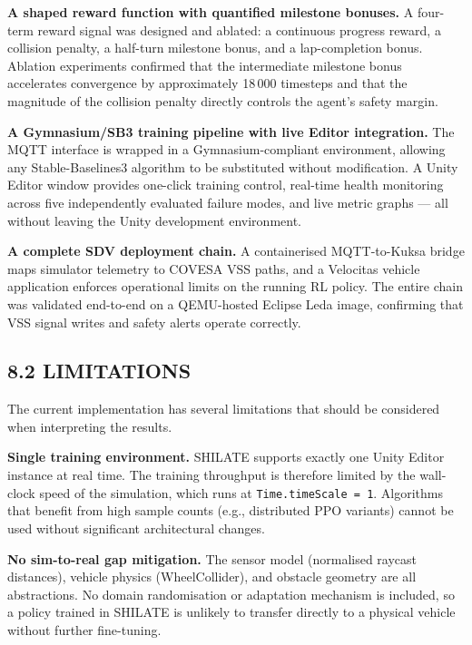 \documentclass[12pt,a4paper]{article}
\begin{document}
\textbf{A shaped reward function with quantified milestone bonuses.} A
four-term reward signal was designed and ablated: a continuous progress reward,
a collision penalty, a half-turn milestone bonus, and a lap-completion bonus.
Ablation experiments confirmed that the intermediate milestone bonus accelerates
convergence by approximately 18\,000 timesteps and that the magnitude of the
collision penalty directly controls the agent's safety margin.

\textbf{A Gymnasium/SB3 training pipeline with live Editor integration.} The
MQTT interface is wrapped in a Gymnasium-compliant environment, allowing any
Stable-Baselines3 algorithm to be substituted without modification. A Unity
Editor window provides one-click training control, real-time health monitoring
across five independently evaluated failure modes, and live metric graphs ---
all without leaving the Unity development environment.

\textbf{A complete SDV deployment chain.} A containerised MQTT-to-Kuksa bridge
maps simulator telemetry to COVESA VSS paths, and a Velocitas vehicle
application enforces operational limits on the running RL policy. The entire
chain was validated end-to-end on a QEMU-hosted Eclipse Leda image, confirming
that VSS signal writes and safety alerts operate correctly.

\subsection*{8.2 \quad LIMITATIONS}

\indent The current implementation has several limitations that should be
considered when interpreting the results.

\textbf{Single training environment.} SHILATE supports exactly one Unity
Editor instance at real time. The training throughput is therefore limited
by the wall-clock speed of the simulation, which runs at
\texttt{Time.timeScale = 1}. Algorithms that benefit from high sample counts
(e.g., distributed PPO variants) cannot be used without significant
architectural changes.

\textbf{No sim-to-real gap mitigation.} The sensor model (normalised raycast
distances), vehicle physics (WheelCollider), and obstacle geometry are all
abstractions. No domain randomisation or adaptation mechanism is included,
so a policy trained in SHILATE is unlikely to transfer directly to a physical
vehicle without further fine-tuning.
\end{document}
